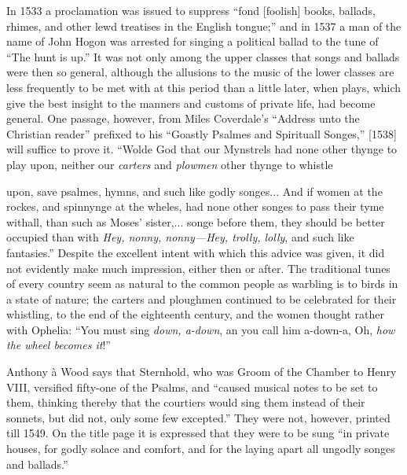 In 1533 a proclamation was issued to suppress “fond [foolish] books, ballads,
rhimes, and other lewd treatises in the English tongue;” and in 1537 a man of
the name of John Hogon was arrested for singing a political ballad to the tune of
“The hunt is up.” It was not only among the upper classes that songs and
ballads were then so general, although the allusions to the music of the lower
classes are less frequently to be met with at this period than a little later, when
plays, which give the best insight to the manners and customs of private life, had
become general. One passage, however, from Miles Coverdale’s “Address unto
the Christian reader” prefixed to his “Goastly Psalmes and Spirituall Songes,”
[1538] will suffice to prove it. “Wolde God that our Mynstrels had none other
thynge to play upon, neither our \textit{carters} \pagebreak 
and \textit{plowmen} other thynge to whistle
upon, save psalmes, hymns, and such like godly songes... And if women at
the rockes, and spinnynge at the wheles, had none other songes to pass their tyme
withall, than such as Moses’ sister,... songe before them, they should be better
occupied than with \textit{Hey, nonny, nonny—Hey, trolly, lolly}, and such like fantasies.”
Despite the excellent intent with which this advice was given, it did not evidently
make much impression, either then or after. The traditional tunes of every
country seem as natural to the common people as warbling is to birds in a
state of nature; the carters and ploughmen continued to be celebrated for their
whistling, to the end of the eighteenth century, and the women thought rather with
Ophelia: “You must sing \textit{down, a-down}, an you call him a-down-a, Oh, \textit{how the
wheel becomes it}!”

Anthony à Wood says that Sternhold, who was Groom of the Chamber to
Henry VIII, versified fifty-one of the Psalms, and “caused musical notes to be
set to them, thinking thereby that the courtiers would sing them instead of their
sonnets, but did not, only some few excepted.” They were not, however, printed
till 1549. On the title page it is expressed that they were to be sung “in private
houses, for godly solace and comfort, and for the laying apart all ungodly songes
and ballads.”

